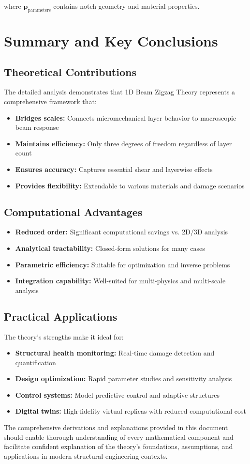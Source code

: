 \documentclass[12pt,a4paper]{article}
\begin{document}
where $\mathbf{p}_{\text{parameters}}$ contains notch geometry and material properties.

\section{Summary and Key Conclusions}

\subsection{Theoretical Contributions}

The detailed analysis demonstrates that 1D Beam Zigzag Theory represents a comprehensive framework that:

\begin{itemize}
\item \textbf{Bridges scales:} Connects micromechanical layer behavior to macroscopic beam response
\item \textbf{Maintains efficiency:} Only three degrees of freedom regardless of layer count
\item \textbf{Ensures accuracy:} Captures essential shear and layerwise effects
\item \textbf{Provides flexibility:} Extendable to various materials and damage scenarios
\end{itemize}

\subsection{Computational Advantages}

\begin{itemize}
\item \textbf{Reduced order:} Significant computational savings vs. 2D/3D analysis
\item \textbf{Analytical tractability:} Closed-form solutions for many cases
\item \textbf{Parametric efficiency:} Suitable for optimization and inverse problems
\item \textbf{Integration capability:} Well-suited for multi-physics and multi-scale analysis
\end{itemize}

\subsection{Practical Applications}

The theory's strengths make it ideal for:
\begin{itemize}
\item \textbf{Structural health monitoring:} Real-time damage detection and quantification
\item \textbf{Design optimization:} Rapid parameter studies and sensitivity analysis
\item \textbf{Control systems:} Model predictive control and adaptive structures
\item \textbf{Digital twins:} High-fidelity virtual replicas with reduced computational cost
\end{itemize}

The comprehensive derivations and explanations provided in this document should enable thorough understanding of every mathematical component and facilitate confident explanation of the theory's foundations, assumptions, and applications in modern structural engineering contexts.
\end{document}
